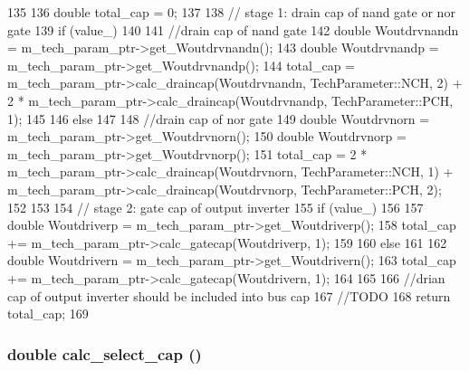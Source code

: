 \begin{DoxyCode}
135 {
136     double total_cap = 0;
137 
138     // stage 1: drain cap of nand gate or nor gate
139     if (value_)
140     {
141         //drain cap of nand gate
142         double Woutdrvnandn = m_tech_param_ptr->get_Woutdrvnandn();
143         double Woutdrvnandp = m_tech_param_ptr->get_Woutdrvnandp();
144         total_cap = m_tech_param_ptr->calc_draincap(Woutdrvnandn, 
      TechParameter::NCH, 2) + 2 * m_tech_param_ptr->calc_draincap(Woutdrvnandp, 
      TechParameter::PCH, 1);
145     }
146     else
147     {
148         //drain cap of nor gate
149         double Woutdrvnorn = m_tech_param_ptr->get_Woutdrvnorn();
150         double Woutdrvnorp = m_tech_param_ptr->get_Woutdrvnorp();
151         total_cap = 2 * m_tech_param_ptr->calc_draincap(Woutdrvnorn, 
      TechParameter::NCH, 1) + m_tech_param_ptr->calc_draincap(Woutdrvnorp, 
      TechParameter::PCH, 2);
152     }
153 
154     // stage 2: gate cap of output inverter
155     if (value_)
156     {
157         double Woutdriverp = m_tech_param_ptr->get_Woutdriverp();
158         total_cap += m_tech_param_ptr->calc_gatecap(Woutdriverp, 1);
159     }
160     else
161     {
162         double Woutdrivern = m_tech_param_ptr->get_Woutdrivern();
163         total_cap += m_tech_param_ptr->calc_gatecap(Woutdrivern, 1);
164     }
165 
166     //drian cap of output inverter should be included into bus cap
167     //TODO
168     return total_cap;
169 }
\end{DoxyCode}
\hypertarget{classOutdrvUnit_a874bd4e177d9811be815cbf21521c785}{
\subsubsection[{calc\_\-select\_\-cap}]{\setlength{\rightskip}{0pt plus 5cm}double calc\_\-select\_\-cap ()}}
\label{classOutdrvUnit_a874bd4e177d9811be815cbf21521c785}



